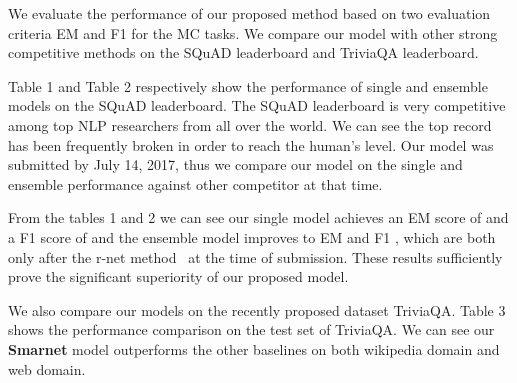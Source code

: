 \documentclass[letterpaper]{article} \usepackage{aaai18}  \usepackage{times}  \usepackage{helvet}  \usepackage{courier}  \usepackage{url}  \usepackage{graphicx}  \usepackage{booktabs}
\begin{document}
We evaluate the performance of our proposed method based on two evaluation criteria EM and F1 for the MC tasks. We compare our model with other strong competitive methods on the SQuAD leaderboard and TriviaQA leaderboard.

Table 1 and Table 2 respectively show the performance of single and ensemble models on the SQuAD leaderboard. The SQuAD leaderboard is very competitive among top NLP researchers from all over the world. We can see the top record has been frequently broken in order to reach the human's level. Our model was submitted by July 14, 2017, thus we compare our model on the single and ensemble performance against other competitor at that time.

From the tables 1 and 2 we can see our single model achieves an EM score of  and a F1 score of  and the ensemble model improves to EM  and F1 , which are both only after the r-net method~\cite{Wang2017GatedSN} at the time of submission. These results sufficiently prove the significant superiority of our proposed model.

We also compare our models on the recently proposed dataset TriviaQA. Table 3 shows the performance comparison on the test set of TriviaQA. We can see our \textbf{Smarnet} model outperforms the other baselines on both wikipedia domain and web domain.
\end{document}
